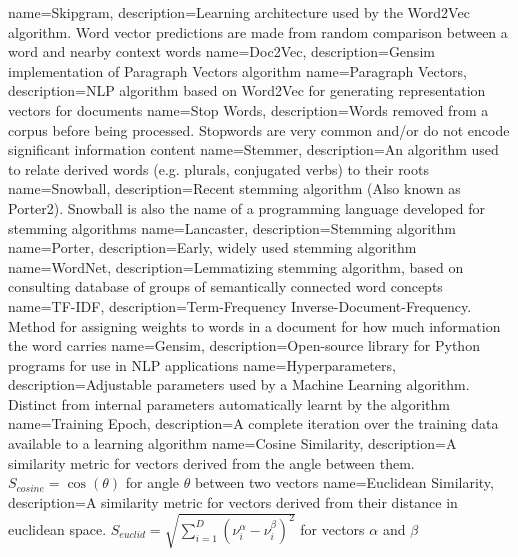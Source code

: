{
name={Skipgram},
description={Learning architecture used by the Word2Vec algorithm. Word vector predictions are made from random comparison between a word and nearby context words} 
}
{
name={Doc2Vec},
description={Gensim implementation of Paragraph Vectors algorithm} 
}
{
name={Paragraph Vectors},
description={NLP algorithm based on Word2Vec for generating representation vectors for documents} 
}
{
name={Stop Words},
description={Words removed from a corpus before being processed. Stopwords are very common and/or do not encode significant information content} 
}
{
name={Stemmer},
description={An algorithm used to relate derived words (e.g. plurals, conjugated verbs) to their roots} 
}
{
name={Snowball},
description={Recent stemming algorithm \cite{snowball} (Also known as Porter2). Snowball is also the name of a programming language developed for stemming algorithms} 
}
{
name={Lancaster},
description={Stemming algorithm \cite{lancaster}} 
}
{
name={Porter},
description={Early, widely used stemming algorithm \cite{porter}} 
}
{
name={WordNet},
description={Lemmatizing stemming algorithm, based on consulting database of groups of semantically connected word concepts \cite{wordnet1} \cite{wordnet2} \cite{wordnet3}} 
}
{
name={TF-IDF},
description={Term-Frequency Inverse-Document-Frequency. Method for assigning weights to words in a document for how much information the word carries} 
}
{
name={Gensim},
description={Open-source library for Python programs for use in NLP applications} 
}
{
name={Hyperparameters},
description={Adjustable parameters used by a Machine Learning algorithm. Distinct from internal parameters automatically learnt by the algorithm} 
}
{
name={Training  Epoch},
description={A complete iteration over the training data available to a learning algorithm} 
}
{
name={Cosine Similarity},
description={A similarity metric for vectors derived from the angle between them. $S_{cosine}=\cos\left(\theta\right)$ for angle $\theta$ between two vectors} 
}
{
name={Euclidean Similarity},
description={A similarity metric for vectors derived from their distance in euclidean space. $S_{euclid} = \sqrt{\sum_{i=1}^{D}(\nu_i^{\alpha}-\nu_i^{\beta})^{2}}$ for vectors $\alpha$ and $\beta$}
}
